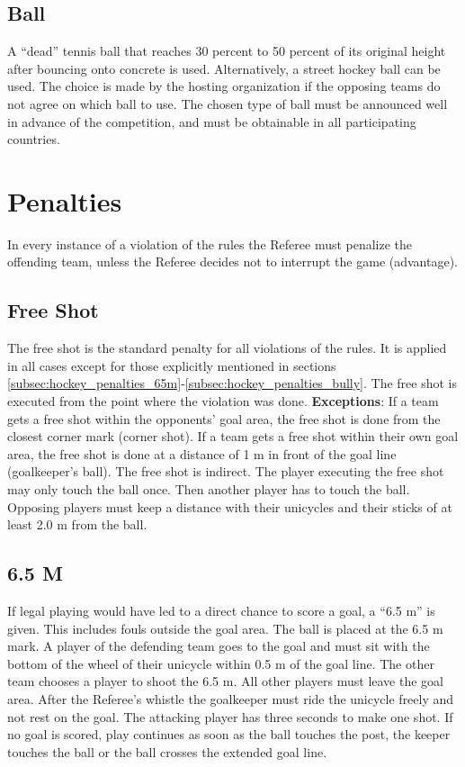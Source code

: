 \subsection{Ball}
A ``dead'' tennis ball that reaches 30 percent to 50 percent of its original height after bouncing onto concrete is used.
Alternatively, a street hockey ball can be used.
The choice is made by the hosting organization if the opposing teams do not agree on which ball to use.
The chosen type of ball must be announced well in advance of the competition, and must be obtainable in all participating countries.

\section{Penalties}
In every instance of a violation of the rules the Referee must penalize the offending team, unless the Referee decides not to interrupt the game (advantage).

\subsection{Free Shot}
The free shot is the standard penalty for all violations of the rules.
It is applied in all cases except for those explicitly mentioned in sections \ref{subsec:hockey_penalties_65m}-\ref{subsec:hockey_penalties_bully}.
The free shot is executed from the point where the violation was done.
\textbf{Exceptions}: If a team gets a free shot within the opponents' goal area, the free shot is done from the closest corner mark (corner shot).
If a team gets a free shot within their own goal area, the free shot is done at a distance of 1 m in front of the goal line (goalkeeper's ball).
The free shot is indirect.
The player executing the free shot may only touch the ball once.
Then another player has to touch the ball.
Opposing players must keep a distance with their unicycles and their sticks of at least 2.0 m from the ball.

\subsection{6.5 M \label{subsec:hockey_penalties_65m}}
If legal playing would have led to a direct chance to score a goal, a ``6.5 m'' is given.
This includes fouls outside the goal area.
The ball is placed at the 6.5 m mark.
A player of the defending team goes to the goal and must sit with the bottom of the wheel of their unicycle within 0.5 m of the goal line.
The other team chooses a player to shoot the 6.5 m.
All other players must leave the goal area.
After the Referee's whistle the goalkeeper must ride the unicycle freely and not rest on the goal.
The attacking player has three seconds to make one shot.
If no goal is scored, play continues as soon as the ball touches the post, the keeper touches the ball or the ball crosses the extended goal line.

